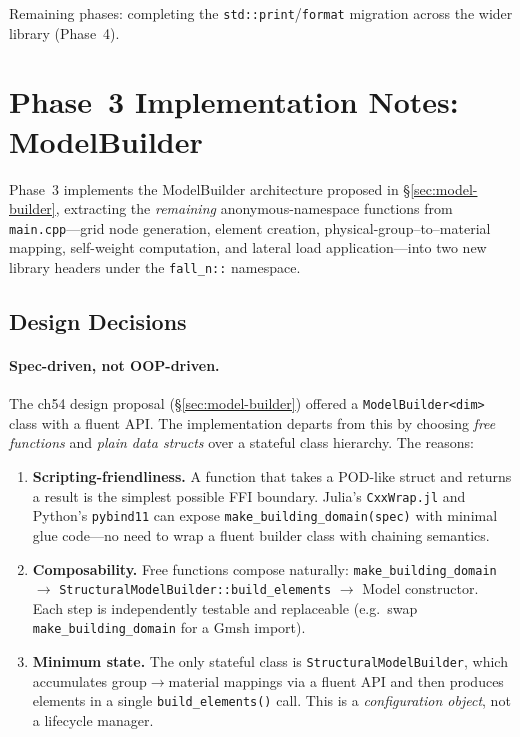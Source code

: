 Remaining phases: completing the
\texttt{std::print}/\texttt{format} migration across the wider
library (Phase~4).


\section{Phase~3 Implementation Notes: ModelBuilder}
\label{sec:phase3-implementation}

Phase~3 implements the ModelBuilder architecture proposed in
\S\ref{sec:model-builder}, extracting the \emph{remaining}
anonymous-namespace functions from \texttt{main.cpp}---grid node
generation, element creation, physical-group--to--material mapping,
self-weight computation, and lateral load application---into two
new library headers under the \texttt{fall\_n::} namespace.

\subsection{Design Decisions}
\label{sec:phase3-decisions}

\paragraph{Spec-driven, not OOP-driven.}
The ch54 design proposal (\S\ref{sec:model-builder}) offered a
\texttt{ModelBuilder<dim>} class with a fluent API.  The implementation
departs from this by choosing \emph{free functions} and \emph{plain
data structs} over a stateful class hierarchy.  The reasons:

\begin{enumerate}
  \item \textbf{Scripting-friendliness.}  A function that takes a
        POD-like struct and returns a result is the simplest possible
        FFI boundary.  Julia's \texttt{CxxWrap.jl} and Python's
        \texttt{pybind11} can expose \texttt{make\_building\_domain(spec)}
        with minimal glue code---no need to wrap a fluent builder class
        with chaining semantics.

  \item \textbf{Composability.}  Free functions compose naturally:
        \texttt{make\_building\_domain} $\to$
        \texttt{StructuralModelBuilder::build\_elements} $\to$
        Model constructor.  Each step is independently testable and
        replaceable (e.g.\ swap \texttt{make\_building\_domain} for a
        Gmsh import).

  \item \textbf{Minimum state.}  The only stateful class is
        \texttt{StructuralModelBuilder}, which accumulates
        group$\to$material mappings via a fluent API and then
        produces elements in a single \texttt{build\_elements()} call.
        This is a \emph{configuration object}, not a lifecycle manager.
\end{enumerate}

